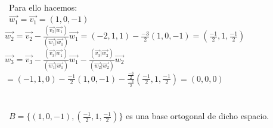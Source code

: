 \documentclass[preview]{standalone}
\begin{document}
\begin{center}
 \\\  Para ello hacemos: \\\  $\vec{w_1} = \vec{v_1} = (1, 0, -1)$  \newline $\vec{w_2} = \vec{v_2} - \frac{(\vec{v_2} | \vec{w_1})}{(\vec{w_1} | \vec{w_1})} \vec{w_1} = (-2, 1, 1) - \frac{-3}{2} (1, 0, -1) = (\frac{-1}{2}, 1, \frac{-1}{2} ) $ \newline $\vec{w_3} = \vec{v_3} - \frac{(\vec{v_3} | \vec{w_1})}{(\vec{w_1} | \vec{w_1})} \vec{w_1} - \frac{(\vec{v_3} | \vec{w_2})}{(\vec{w_2} | \vec{w_2})} \vec{w_2} $\newline $ = (-1, 1, 0) - \frac{-1}{2} (1, 0, -1) - \frac{\frac{-3}{2}}{\frac{-3}{2}} (\frac{-1}{2}, 1, \frac{-1}{2}) = (0, 0, 0) $ \\\ \\\  \\\ $B = \{ (1, 0, -1), (\frac{-1}{2}, 1, \frac{-1}{2}) \} $ es una base ortogonal de dicho espacio.
\end{center}
\end{document}
